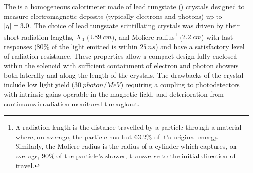 The \ECAL is a homogeneous calorimeter made of lead tungstate (\pbwo) crystals designed to measure electromagnetic deposits (typically electrons and photons) up to ${|\eta|=3.0}$. The choice of lead tungstate scintillating crystals was driven by their short radiation lengths, $X_0$ (${\SI{0.89}{cm}}$), and Moliere radius\footnote{A radiation length is the distance travelled by a particle through a material where, on average, the particle has lost $63.2\%$ of it's original energy. Similarly, the Moliere radius is the radius of a cylinder which captures, on average, $90\%$ of the particle's shower, transverse to the initial direction of travel.} (${\SI{2.2}{cm}}$) with fast responses ($80\%$ of the light emitted is within ${\SI{25}{ns}}$) and have a satisfactory level of radiation resistance. These properties allow a compact design fully enclosed within the solenoid with sufficient containment of electron and photon showers both laterally and along the length of the crystals. The drawbacks of the crystal include low light yield (${\SI{30}{photon/MeV}}$) requiring a coupling to photodetectors with intrinsic gains operable in the magnetic field, and deterioration from continuous irradiation monitored throughout.


